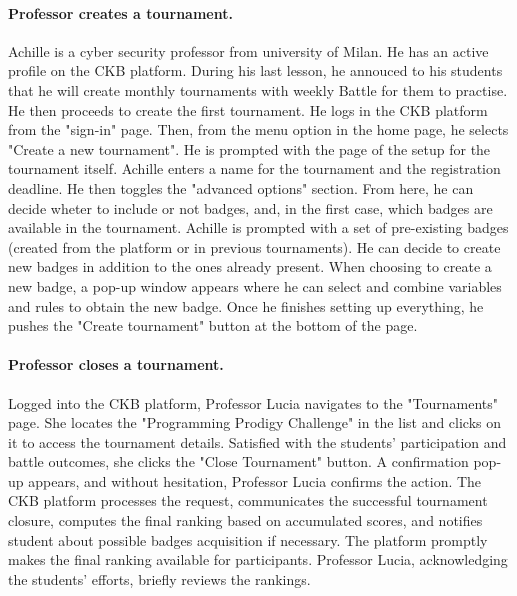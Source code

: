 \paragraph{Professor creates a tournament.}
Achille is a cyber security professor from university of Milan. He has an active profile on the CKB platform. 
During his last lesson, he annouced to his students that he will create monthly tournaments with weekly Battle for them to practise. 
He then proceeds to create the first tournament. He logs in the CKB platform from the "sign-in" page. 
Then, from the menu option in the home page, he selects "Create a new tournament". He is prompted with the page of the setup for the tournament itself. 
Achille enters a name for the tournament and the registration deadline. He then toggles the "advanced options" section. 
From here, he can decide wheter to include or not badges, and, in the first case, which badges are available in the tournament. 
Achille is prompted with a set of pre-existing badges (created from the platform or in previous tournaments). He can decide to 
create new badges in addition to the ones already present. When choosing to create a new badge, a pop-up window appears where he can select and combine 
variables and rules to obtain the new badge. Once he finishes setting up everything, he pushes the "Create tournament" button at the bottom of the page. 

\paragraph*{Professor closes a tournament.}
Logged into the CKB platform, Professor Lucia navigates to the "Tournaments" page. She locates the "Programming Prodigy Challenge" in the list and clicks
on it to access the tournament details. Satisfied with the students' participation and battle outcomes, she clicks the "Close Tournament" button.
A confirmation pop-up appears, and without hesitation, Professor Lucia confirms the action. The CKB platform processes the request, communicates 
the successful tournament closure, computes the final ranking based on accumulated scores, and notifies student about possible badges acquisition if necessary.
The platform promptly makes the final ranking available for participants. Professor Lucia, acknowledging the students' efforts, briefly reviews the rankings. 

